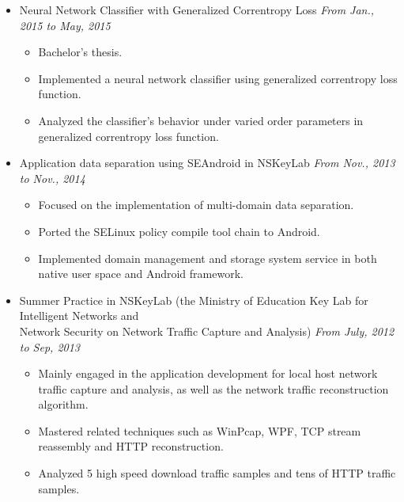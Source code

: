 \documentclass[letterpaper,11pt]{article}
\newenvironment{extra}{}{}
\begin{document}
\begin{itemize}
    \item Neural Network Classifier with Generalized Correntropy Loss \hfill \textit{From Jan., 2015 to
May, 2015}
    \begin{itemize}
        \item Bachelor's thesis.
        \item Implemented a neural network classifier using generalized correntropy loss function.
        \item Analyzed the classifier's behavior under varied order parameters in generalized correntropy loss
function.
    \end{itemize}

\begin{extra}
    \item Application data separation using SEAndroid in NSKeyLab \hfill \textit{From Nov., 2013 to Nov., 2014}
    \begin{itemize}
        \item Focused on the implementation of multi-domain data separation.
        \item Ported the SELinux policy compile tool chain to Android.
        \item Implemented domain management and storage system service in both native user space and Android
framework.
    \end{itemize}
\end{extra}

\begin{extra}
    \item Summer Practice in NSKeyLab (the Ministry of Education Key Lab for Intelligent Networks and \\ Network
    Security on Network Traffic Capture and Analysis) \hfill \textit{From July, 2012 to Sep, 2013}
    \begin{itemize}
        \item Mainly engaged in the application development for local host network traffic capture and
analysis, as well as the network traffic reconstruction algorithm.
        \item Mastered related techniques such as WinPcap, WPF, TCP stream reassembly and HTTP reconstruction.
        \item Analyzed 5 high speed download traffic samples and tens of HTTP traffic samples.
    \end{itemize}
\end{extra}


\end{itemize}
\end{document}

